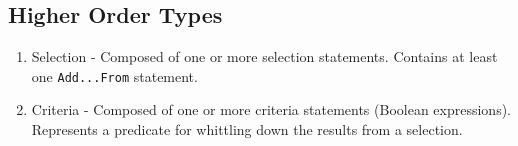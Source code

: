 \subsection{Higher Order Types}
\begin{enumerate}
\item Selection - Composed of one or more selection statements. Contains at least one \texttt{Add...From} statement.
\item Criteria - Composed of one or more criteria statements (Boolean expressions). Represents a predicate for whittling down the results from a selection. 
\end{enumerate}